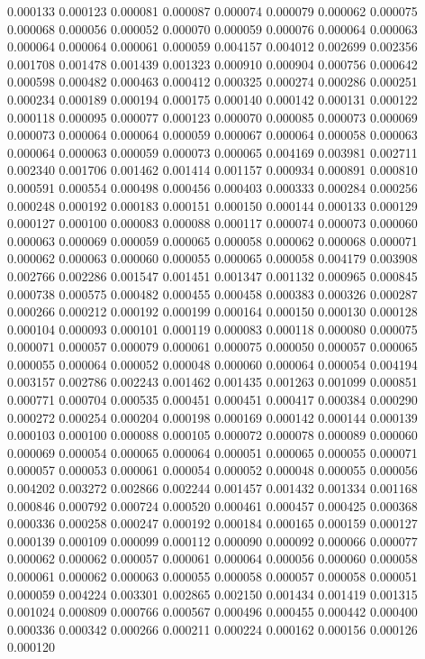 0.000133
0.000123
0.000081
0.000087
0.000074
0.000079
0.000062
0.000075
0.000068
0.000056
0.000052
0.000070
0.000059
0.000076
0.000064
0.000063
0.000064
0.000064
0.000061
0.000059
0.004157
0.004012
0.002699
0.002356
0.001708
0.001478
0.001439
0.001323
0.000910
0.000904
0.000756
0.000642
0.000598
0.000482
0.000463
0.000412
0.000325
0.000274
0.000286
0.000251
0.000234
0.000189
0.000194
0.000175
0.000140
0.000142
0.000131
0.000122
0.000118
0.000095
0.000077
0.000123
0.000070
0.000085
0.000073
0.000069
0.000073
0.000064
0.000064
0.000059
0.000067
0.000064
0.000058
0.000063
0.000064
0.000063
0.000059
0.000073
0.000065
0.004169
0.003981
0.002711
0.002340
0.001706
0.001462
0.001414
0.001157
0.000934
0.000891
0.000810
0.000591
0.000554
0.000498
0.000456
0.000403
0.000333
0.000284
0.000256
0.000248
0.000192
0.000183
0.000151
0.000150
0.000144
0.000133
0.000129
0.000127
0.000100
0.000083
0.000088
0.000117
0.000074
0.000073
0.000060
0.000063
0.000069
0.000059
0.000065
0.000058
0.000062
0.000068
0.000071
0.000062
0.000063
0.000060
0.000055
0.000065
0.000058
0.004179
0.003908
0.002766
0.002286
0.001547
0.001451
0.001347
0.001132
0.000965
0.000845
0.000738
0.000575
0.000482
0.000455
0.000458
0.000383
0.000326
0.000287
0.000266
0.000212
0.000192
0.000199
0.000164
0.000150
0.000130
0.000128
0.000104
0.000093
0.000101
0.000119
0.000083
0.000118
0.000080
0.000075
0.000071
0.000057
0.000079
0.000061
0.000075
0.000050
0.000057
0.000065
0.000055
0.000064
0.000052
0.000048
0.000060
0.000064
0.000054
0.004194
0.003157
0.002786
0.002243
0.001462
0.001435
0.001263
0.001099
0.000851
0.000771
0.000704
0.000535
0.000451
0.000451
0.000417
0.000384
0.000290
0.000272
0.000254
0.000204
0.000198
0.000169
0.000142
0.000144
0.000139
0.000103
0.000100
0.000088
0.000105
0.000072
0.000078
0.000089
0.000060
0.000069
0.000054
0.000065
0.000064
0.000051
0.000065
0.000055
0.000071
0.000057
0.000053
0.000061
0.000054
0.000052
0.000048
0.000055
0.000056
0.004202
0.003272
0.002866
0.002244
0.001457
0.001432
0.001334
0.001168
0.000846
0.000792
0.000724
0.000520
0.000461
0.000457
0.000425
0.000368
0.000336
0.000258
0.000247
0.000192
0.000184
0.000165
0.000159
0.000127
0.000139
0.000109
0.000099
0.000112
0.000090
0.000092
0.000066
0.000077
0.000062
0.000062
0.000057
0.000061
0.000064
0.000056
0.000060
0.000058
0.000061
0.000062
0.000063
0.000055
0.000058
0.000057
0.000058
0.000051
0.000059
0.004224
0.003301
0.002865
0.002150
0.001434
0.001419
0.001315
0.001024
0.000809
0.000766
0.000567
0.000496
0.000455
0.000442
0.000400
0.000336
0.000342
0.000266
0.000211
0.000224
0.000162
0.000156
0.000126
0.000120
